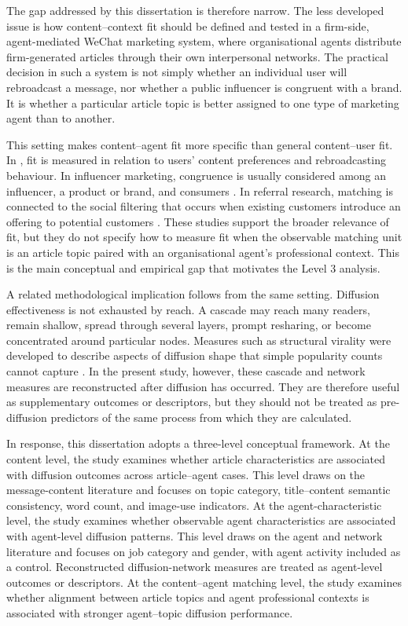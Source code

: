 The gap addressed by this dissertation is therefore narrow. The less developed issue is how content–context fit should be defined and tested in a firm-side, agent-mediated WeChat marketing system, where organisational agents distribute firm-generated articles through their own interpersonal networks. The practical decision in such a system is not simply whether an individual user will rebroadcast a message, nor whether a public influencer is congruent with a brand. It is whether a particular article topic is better assigned to one type of marketing agent than to another.

This setting makes content–agent fit more specific than general content–user fit. In \textcite{zhang2017}, fit is measured in relation to users' content preferences and rebroadcasting behaviour. In influencer marketing, congruence is usually considered among an influencer, a product or brand, and consumers \parencite{belanche2021,breves2019}. In referral research, matching is connected to the social filtering that occurs when existing customers introduce an offering to potential customers \parencite{vandenbulte2018}. These studies support the broader relevance of fit, but they do not specify how to measure fit when the observable matching unit is an article topic paired with an organisational agent's professional context. This is the main conceptual and empirical gap that motivates the Level 3 analysis.

A related methodological implication follows from the same setting. Diffusion effectiveness is not exhausted by reach. A cascade may reach many readers, remain shallow, spread through several layers, prompt resharing, or become concentrated around particular nodes. Measures such as structural virality were developed to describe aspects of diffusion shape that simple popularity counts cannot capture \parencite{goel2016}. In the present study, however, these cascade and network measures are reconstructed after diffusion has occurred. They are therefore useful as supplementary outcomes or descriptors, but they should not be treated as pre-diffusion predictors of the same process from which they are calculated.

In response, this dissertation adopts a three-level conceptual framework. At the content level, the study examines whether article characteristics are associated with diffusion outcomes across article–agent cases. This level draws on the message-content literature and focuses on topic category, title–content semantic consistency, word count, and image-use indicators. At the agent-characteristic level, the study examines whether observable agent characteristics are associated with agent-level diffusion patterns. This level draws on the agent and network literature and focuses on job category and gender, with agent activity included as a control. Reconstructed diffusion-network measures are treated as agent-level outcomes or descriptors. At the content–agent matching level, the study examines whether alignment between article topics and agent professional contexts is associated with stronger agent–topic diffusion performance.

